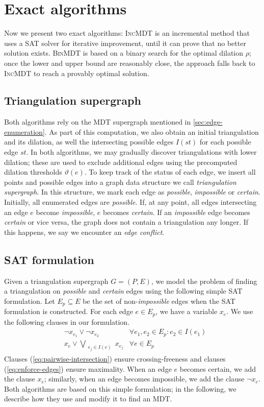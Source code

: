 \section{Exact algorithms}
\newcommand{\binmdt}{\textsc{BinMDT}}%
\newcommand{\incmdt}{\textsc{IncMDT}}%
\label{sec:exact-algorithms}%
Now we present two exact algorithms:
\incmdt{} is an incremental method that uses a SAT solver for
iterative improvement, until it can prove that no better solution exists.
\binmdt{} is based on a binary search for the optimal dilation $\rho$;
once the lower and upper bound are reasonably close,
the approach falls back to \incmdt{} to reach a provably optimal solution.

\subsection{Triangulation supergraph}
Both algorithms rely on the MDT supergraph mentioned in \cref{sec:edge-enumeration}.
As part of this computation, we also obtain an initial triangulation and its dilation,
as well the intersecting possible edges $I(st)$ for each possible edge $st$.
In both algorithms, we may gradually discover triangulations with lower dilation;
these are used to exclude additional edges using the precomputed dilation thresholds $\vartheta(e)$.
To keep track of the status of each edge,
we insert all points and possible edges into a graph data structure we call \emph{triangulation supergraph}.
In this structure, we mark each edge as \emph{possible}, \emph{impossible} or \emph{certain}.
Initially, all enumerated edges are \emph{possible}.
If, at any point, all edges intersecting an edge $e$ become \emph{impossible}, $e$ becomes \emph{certain}.
If an \emph{impossible} edge becomes \emph{certain} or vice versa, the graph does not contain a triangulation any longer.
If this happens, we say we encounter an \emph{edge conflict}.

\subsection{SAT formulation}
Given a triangulation supergraph $G = (P, E)$, we model the problem of finding a triangulation 
on \emph{possible} and \emph{certain} edges using the following simple SAT formulation.
Let $E_p \subseteq E$ be the set of non-\emph{impossible} edges when the SAT formulation is constructed.
For each edge $e \in E_p$, we have a variable $x_e$.
We use the following clauses in our formulation.
\begin{align}
    &\lnot x_{e_1} \lor \lnot x_{e_2} &\forall e_1, e_2 \in E_p: e_2 \in I(e_1) \label{eq:pairwise-intersection}\\
    &x_e \lor \bigvee_{\substack{e_j \in I(e)}} x_{e_j} &\forall e \in E_p\label{eq:enforce-edges}
\end{align}
Clauses (\ref{eq:pairwise-intersection}) ensure crossing-freeness and clauses (\ref{eq:enforce-edges}) ensure maximality.
When an edge $e$ becomes certain, we add the clause $x_e$; similarly, when an edge becomes impossible, we add the clause $\lnot x_e$.
Both algorithms are based on this simple formulation;
in the following, we describe how they use and modify it to find an MDT.

